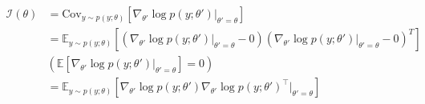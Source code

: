 \begin{answer}
\begin{align*}
    \mathcal{I}(\theta) &= \text{Cov}_{y \sim p(y;\theta)}[\nabla_{\theta'}\log p(y;\theta')|_{\theta'=\theta}]\\
    &= \mathbb{E}_{y \sim p(y; \theta)}[(\nabla_{\theta'}\log p(y;\theta')|_{\theta'=\theta} - 0)(\nabla_{\theta'}\log p(y;\theta')|_{\theta'=\theta} - 0)^T]\\
    &(\mathbb{E}[\nabla_{\theta'}\log p(y;\theta')|_{\theta'=\theta}] = 0)\\
    &=\mathbb{E}_{y\sim p(y;\theta)}[\nabla_{\theta'} \log p(y;\theta')\nabla_{\theta'} \log p(y;\theta')^\top|_{\theta'=\theta}]
\end{align*}
\end{answer}
